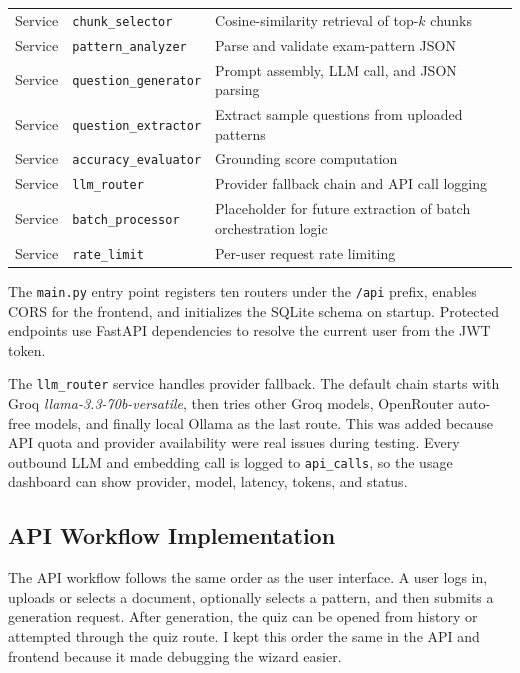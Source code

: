 \documentclass[12pt,a4paper]{article}
\begin{document}
\begin{table}[H]
\begin{tabular}{p{1.4cm}p{4.2cm}p{7.8cm}}
    Service & \texttt{chunk\_selector}      & Cosine-similarity retrieval of top-$k$ chunks \\
    Service & \texttt{pattern\_analyzer}    & Parse and validate exam-pattern JSON \\
    Service & \texttt{question\_generator}  & Prompt assembly, LLM call, and JSON parsing \\
    Service & \texttt{question\_extractor}  & Extract sample questions from uploaded patterns \\
    Service & \texttt{accuracy\_evaluator}  & Grounding score computation \\
    Service & \texttt{llm\_router}          & Provider fallback chain and API call logging \\
    Service & \texttt{batch\_processor}     & Placeholder for future extraction of batch orchestration logic \\
    Service & \texttt{rate\_limit}          & Per-user request rate limiting \\
    \bottomrule
  \end{tabular}
\end{table}

The \texttt{main.py} entry point registers ten routers under the
\texttt{/api} prefix, enables CORS for the frontend, and initializes the
SQLite schema on startup. Protected endpoints use FastAPI dependencies to
resolve the current user from the JWT token.

The \texttt{llm\_router} service handles provider fallback. The default
chain starts with Groq \textit{llama-3.3-70b-versatile}, then tries other
Groq models, OpenRouter auto-free models, and finally local Ollama as the
last route. This was added because API quota and provider availability were
real issues during testing. Every outbound LLM and embedding call is logged
to \texttt{api\_calls}, so the usage dashboard can show provider, model,
latency, tokens, and status.

\subsection{API Workflow Implementation}

The API workflow follows the same order as the user interface. A user logs
in, uploads or selects a document, optionally selects a pattern, and then
submits a generation request. After generation, the quiz can be opened from
history or attempted through the quiz route. I kept this order the same in
the API and frontend because it made debugging the wizard easier.
\end{document}
